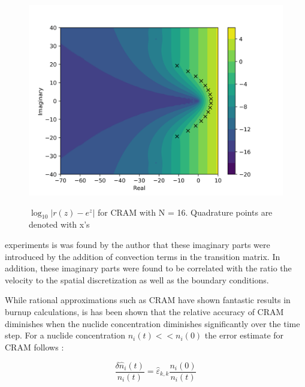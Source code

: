 \begin{figure}[p]
  \centering
  \includegraphics[width=5in]{images/chapter-3/RationApproxCRAMError16.png}\\
  \caption{$\log_{10}|r(z)-e^{z}|$ for CRAM with N = 16. Quadrature points are denoted with x's}
  \label{fig:complexRationalApproxCRAM}
\end{figure} 

\clearpage

\noindent experiments is was found by the author that these imaginary parts were introduced by the addition of convection terms in the transition matrix. In addition, these imaginary parts were found to be correlated with the ratio the velocity to the spatial discretization as well as the boundary conditions. 

While rational approximations such as CRAM have shown fantastic results in burnup calculations, is has been shown that the relative accuracy of CRAM diminishes when the nuclide concentration diminishes significantly over the time step. For a nuclide concentration $n_{i}(t) << n_{i}(0)$ the error estimate for CRAM follows \cite{isotalo2016}:

\begin{equation}
    \frac{\delta \hat{n}_{i}(t)}{n_{i}(t)} = \hat{\varepsilon}_{k,k} \frac{n_{i}(0)}{n_{i}(t)}
    \label{eq:CRAMError}
\end{equation}


